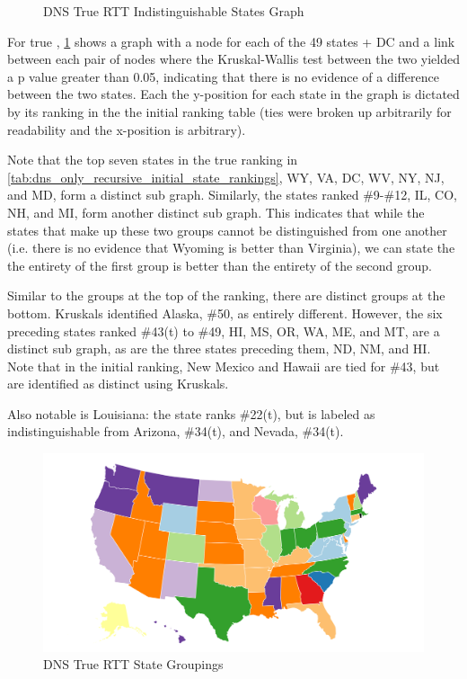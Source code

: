 \begin{figure}[H]
    \centering
    
    \caption{DNS True RTT Indistinguishable States Graph}
    \label{fig:dns_true_rtt_indistinguishable_states_graph}
\end{figure}

For true \rtt, \cref{fig:dns_true_rtt_indistinguishable_states_graph} shows a graph with a node for each of the 49 states + DC and a link between each pair of nodes where the Kruskal-Wallis test between the two yielded a p value greater than 0.05, indicating that there is no evidence of a difference between the two states. Each the y-position for each state in the graph is dictated by its ranking in the the initial ranking table (ties were broken up arbitrarily for readability and the x-position is arbitrary). 

Note that the top seven states in the true \rtt ranking in \cref{tab:dns_only_recursive_initial_state_rankings}, WY, VA, DC, WV, NY, NJ, and MD, form a distinct sub graph. Similarly, the states ranked \#9-\#12, IL, CO, NH, and MI, form another distinct sub graph. This indicates that while the states that make up these two groups cannot be distinguished from one another (i.e. there is no evidence that Wyoming is better than Virginia), we can state the the entirety of the first group is better than the entirety of the second group.

Similar to the groups at the top of the ranking, there are distinct groups at the bottom. Kruskals identified Alaska, \#50, as entirely different. However, the six preceding states ranked \#43(t) to \#49, HI, MS, OR, WA, ME, and MT, are a distinct sub graph, as are the three states preceding them, ND, NM, and HI. Note that in the initial ranking, New Mexico and Hawaii are tied for \#43, but are identified as distinct using Kruskals.

Also notable is Louisiana: the state ranks \#22(t), but is labeled as indistinguishable from Arizona, \#34(t), and Nevada, \#34(t).

\begin{figure}[H]
    \centering
    \includegraphics{images/dns/analysis_no_auth_agg/rtt/no_auth_distinct_rtt_map.png}
    \caption{DNS True RTT State Groupings}
    \label{fig:dns_true_rtt_indistinguishable_states_map}
\end{figure}

